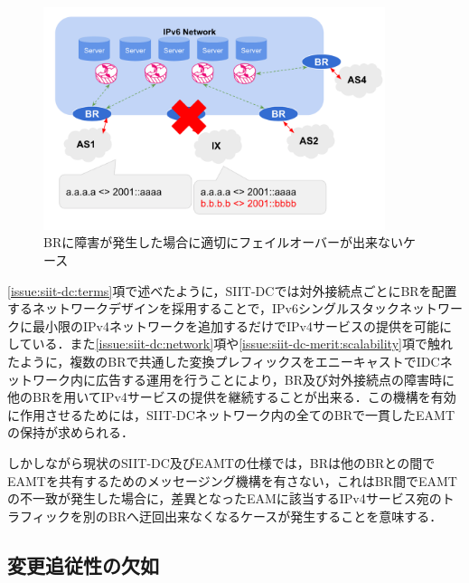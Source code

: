 \begin{figure}[h]
    \begin{center}
      \includegraphics[width=10cm,pagebox=cropbox,clip]{img/siit-dc_can-not-failover.png}
    \end{center}
    \caption{BRに障害が発生した場合に適切にフェイルオーバーが出来ないケース}
    \label{fig:siit-dc_can-not-failover}
\end{figure}

\ref{issue:siit-dc:terms}項で述べたように，SIIT-DCでは対外接続点ごとにBRを配置するネットワークデザインを採用することで，IPv6シングルスタックネットワークに最小限のIPv4ネットワークを追加するだけでIPv4サービスの提供を可能にしている．また\ref{issue:siit-dc:network}項や\ref{issue:siit-dc-merit:scalability}項で触れたように，複数のBRで共通した変換プレフィックスをエニーキャストでIDCネットワーク内に広告する運用を行うことにより，BR及び対外接続点の障害時に他のBRを用いてIPv4サービスの提供を継続することが出来る．この機構を有効に作用させるためには，SIIT-DCネットワーク内の全てのBRで一貫したEAMTの保持が求められる．

しかしながら現状のSIIT-DC及びEAMTの仕様\cite{RFC7755,RFC7756,RFC7757}では，BRは他のBRとの間でEAMTを共有するためのメッセージング機構を有さない，これはBR間でEAMTの不一致が発生した場合に，差異となったEAMに該当するIPv4サービス宛のトラフィックを別のBRへ迂回出来なくなるケースが発生することを意味する．


\subsection{変更追従性の欠如}
\label{issue:siit-dc_problems:follow}

